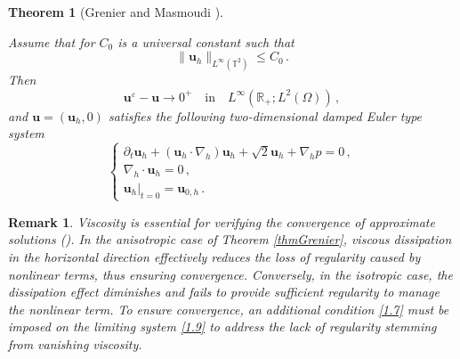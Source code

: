 \documentclass[pdflatex,sn-mathphys-num]{sn-jnl}%
\theoremstyle{thmstyleone}%
\newtheorem{theorem}{Theorem}%
\theoremstyle{thmstyletwo}%
\newtheorem{remark}{Remark}%
\theoremstyle{thmstylethree}%
\theoremstyle{thmstyletwo}
\begin{document}
\begin{theorem}[Grenier and Masmoudi \cite{Grenier1997}]
\begin{enumerate}[1.]
		Assume that for $C_0$ is a universal constant such that
		\begin{equation}\label{1.7}
			\lVert{\boldsymbol{u}}_h\rVert_{{L}^{\infty}(\mathbb{T}^2)}\leq
			C_0\,.
		\end{equation}	
		Then 
		\begin{equation}\label{1.8}
			\boldsymbol{u}^\varepsilon-{\boldsymbol{u}}\rightarrow 0^+\quad\text{in}\quad L^\infty(\mathbb{R_+};L^2(\Omega))\,,
		\end{equation}
		and ${\boldsymbol{u}}=(\boldsymbol{u}_h,0)$ satisfies the following two-dimensional damped Euler type system
		\begin{equation}\label{1.9}
			\begin{cases}
				\partial_{t}  {\boldsymbol u}_h+( {\boldsymbol u}_h \cdot \nabla_h)  {\boldsymbol u}_h
				+\sqrt{2}{\boldsymbol u}_h+\nabla_h p=0\,,\\
				\nabla_h\cdot {\boldsymbol u}_h=0\,,\\
				{\boldsymbol u}_h|_{t=0}= {\boldsymbol u}_{0,h}\,.
			\end{cases}
		\end{equation}
	\end{enumerate}
\end{theorem}
\begin{remark}
	Viscosity is essential for verifying the convergence of approximate solutions (\cite{Chemin2006}). In the anisotropic case of Theorem \ref{thmGrenier}, viscous dissipation in the horizontal direction effectively reduces the loss of regularity caused by nonlinear terms, thus ensuring convergence. Conversely, in the isotropic case, the dissipation effect diminishes and fails to provide sufficient regularity to manage the nonlinear term. To ensure convergence, an additional condition \eqref{1.7} must be imposed on the limiting system \eqref{1.9} to address the lack of regularity stemming from vanishing viscosity. 
\end{remark}



 
\end{document}
